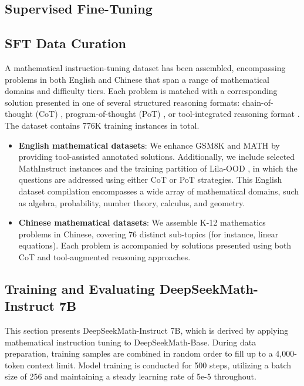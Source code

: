 \begin{itemize}[topsep=0pt]
\section{Supervised Fine-Tuning}

\subsection{SFT Data Curation}

A mathematical instruction-tuning dataset has been assembled, encompassing problems in both English and Chinese that span a range of mathematical domains and difficulty tiers. Each problem is matched with a corresponding solution presented in one of several structured reasoning formats: chain-of-thought (CoT) \citep{cot}, program-of-thought (PoT) \citep{pot,pal}, or tool-integrated reasoning format \citep{tora}. The dataset contains 776K training instances in total.

\begin{itemize}[topsep=0pt]
    \item \textbf{English mathematical datasets}: We enhance GSM8K and MATH by providing tool-assisted annotated solutions. Additionally, we include selected MathInstruct \citep{MathInstruct} instances and the training partition of Lila-OOD \citep{lila}, in which the questions are addressed using either CoT or PoT strategies. This English dataset compilation encompasses a wide array of mathematical domains, such as algebra, probability, number theory, calculus, and geometry.
    \item \textbf{Chinese mathematical datasets}: We assemble K-12 mathematics problems in Chinese, covering 76 distinct sub-topics (for instance, linear equations). Each problem is accompanied by solutions presented using both CoT and tool-augmented reasoning approaches.
\end{itemize}

\subsection{Training and Evaluating DeepSeekMath-Instruct 7B}

This section presents DeepSeekMath-Instruct 7B, which is derived by applying mathematical instruction tuning to DeepSeekMath-Base. During data preparation, training samples are combined in random order to fill up to a 4,000-token context limit. Model training is conducted for 500 steps, utilizing a batch size of 256 and maintaining a steady learning rate of 5e-5 throughout.


\end{itemize}
